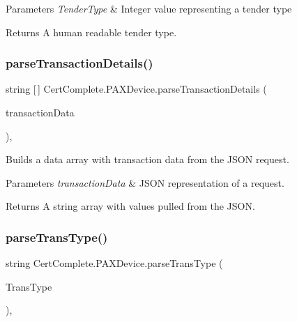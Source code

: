 \begin{DoxyParams}{Parameters}
{\em Tender\+Type} & Integer value representing a tender type\\
\hline
\end{DoxyParams}
\begin{DoxyReturn}{Returns}
A human readable tender type.
\end{DoxyReturn}
\mbox{\label{class_cert_complete_1_1_p_a_x_device_ac404eca26b52ca9becaba9d29594e09a}} 
\subsubsection{\texorpdfstring{parse\+Transaction\+Details()}{parseTransactionDetails()}}
{\footnotesize\ttfamily string \mbox{[}$\,$\mbox{]} Cert\+Complete.\+P\+A\+X\+Device.\+parse\+Transaction\+Details (\begin{DoxyParamCaption}\item[{Newtonsoft.\+Json.\+Linq.\+J\+Token}]{transaction\+Data }\end{DoxyParamCaption})\hspace{0.3cm}{\ttfamily [inline]}, {\ttfamily [private]}}



Builds a data array with transaction data from the J\+S\+ON request. 


\begin{DoxyParams}{Parameters}
{\em transaction\+Data} & J\+S\+ON representation of a request.\\
\hline
\end{DoxyParams}
\begin{DoxyReturn}{Returns}
A string array with values pulled from the J\+S\+ON.
\end{DoxyReturn}
\mbox{\label{class_cert_complete_1_1_p_a_x_device_a54cc04faf61b6e9a46363bb7a501124b}} 
\subsubsection{\texorpdfstring{parse\+Trans\+Type()}{parseTransType()}}
{\footnotesize\ttfamily string Cert\+Complete.\+P\+A\+X\+Device.\+parse\+Trans\+Type (\begin{DoxyParamCaption}\item[{int}]{Trans\+Type }\end{DoxyParamCaption})\hspace{0.3cm}{\ttfamily [inline]}, {\ttfamily [private]}}



